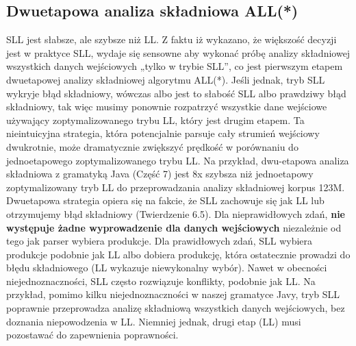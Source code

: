 \subsection{Dwuetapowa analiza składniowa ALL(*)}
SLL jest słabsze, ale szybsze niż LL.
Z faktu iż wykazano, że większość decyzji jest w praktyce SLL, wydaje się
sensowne aby wykonać próbę analizy składniowej wszystkich danych wejściowych
„tylko w trybie SLL”, co jest pierwszym etapem dwuetapowej analizy składniowej algorytmu ALL(*).
Jeśli jednak, tryb SLL wykryje błąd składniowy, wówczas albo jest to słabość SLL
albo prawdziwy błąd składniowy, tak więc musimy ponownie rozpatrzyć wszystkie
dane wejściowe używający zoptymalizowanego trybu LL, który jest drugim etapem.
Ta nieintuicyjna strategia, która potencjalnie parsuje cały strumień wejściowy dwukrotnie,
może dramatycznie zwiększyć prędkość w porównaniu do jednoetapowego zoptymalizowanego trybu LL.
Na przykład, dwu-etapowa analiza składniowa z gramatyką Java (Część 7) jest 8x szybsza
niż jednoetapowy zoptymalizowany tryb LL do przeprowadzania analizy składniowej korpus 123M.
Dwuetapowa strategia opiera się na fakcie, że SLL zachowuje się jak LL
lub otrzymujemy błąd składniowy (Twierdzenie 6.5).
Dla nieprawidłowych zdań, \textbf{nie występuje żadne wyprowadzenie dla danych
wejściowych} niezależnie od tego jak parser wybiera produkcje.
Dla prawidłowych zdań, SLL wybiera produkcje podobnie jak LL albo dobiera produkcję,
która ostatecznie prowadzi do błędu składniowego (LL wykazuje niewykonalny wybór).
Nawet w obecności niejednoznaczności, SLL często rozwiązuje konflikty, podobnie jak LL.
Na przykład, pomimo kilku niejednoznaczności w naszej gramatyce Javy, tryb SLL
poprawnie przeprowadza analizę składniową wszystkich danych wejściowych,
bez doznania niepowodzenia w LL. Niemniej jednak,
drugi etap (LL) musi pozostawać do zapewnienia poprawności.
